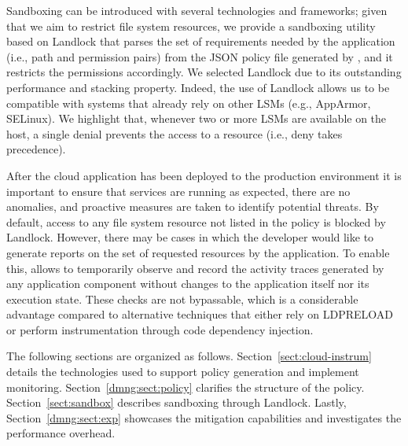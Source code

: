 Sandboxing can be introduced with several technologies and frameworks;
given that we aim to restrict file system resources, we provide a
sandboxing utility based on Landlock that parses the set of
requirements needed by the application (i.e., path and permission
pairs) from the JSON policy file generated by \dmng, and it restricts
the permissions accordingly. We selected Landlock due to its
outstanding performance and stacking property.  Indeed, the use of
Landlock allows us to be compatible with systems that already rely on
other LSMs (e.g., AppArmor, SELinux).  We highlight that, whenever two
or more LSMs are available on the host, a single denial prevents the
access to a resource (i.e., deny takes precedence).

After the cloud application has been deployed to the production
environment it is important to ensure that services are running as
expected, there are no anomalies, and proactive measures are taken to
identify potential threats. By default, access to any file system
resource not listed in the policy is blocked by Landlock. However,
there may be cases in which the developer would like to generate
reports on the set of requested resources by the application. To
enable this, \dmng allows to temporarily observe and record the
activity traces generated by any application component without changes
to the application itself nor its execution state. These checks are
not bypassable, which is a considerable advantage compared to
alternative techniques that either rely on LD\textunderscore PRELOAD
or perform instrumentation through code dependency injection.

The following sections are organized as
follows. Section~\ref{sect:cloud-instrum} details the technologies
used to support policy generation and implement
monitoring. Section~\ref{dmng:sect:policy} clarifies the structure of the
policy. Section~\ref{sect:sandbox} describes sandboxing through
Landlock. Lastly, Section~\ref{dmng:sect:exp} showcases the mitigation
capabilities and investigates the performance overhead.


